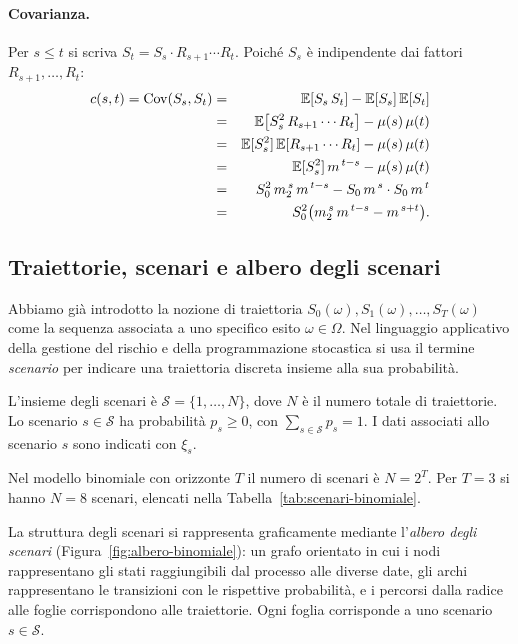 \paragraph{Covarianza.}
Per $s\leq t$ si scriva $S_t=S_s\cdot R_{s+1}\cdots R_t$. Poich\'{e}
$S_s$ \`{e} indipendente dai fattori $R_{s+1},\ldots,R_t$:
\begin{eqnarray*}
c(s,t)=\operatorname{Cov}(S_s,S_t)
&=& \mathbb{E}[S_s\,S_t]-\mathbb{E}[S_s]\,\mathbb{E}[S_t]\\
&=& \mathbb{E}\bigl[S_s^2\,R_{s+1}\cdots R_t\bigr]-\mu(s)\,\mu(t)\\
&=& \mathbb{E}[S_s^2]\,\mathbb{E}[R_{s+1}\cdots R_t]-\mu(s)\,\mu(t)\\
&=& \mathbb{E}[S_s^2]\,m^{\,t-s}-\mu(s)\,\mu(t)\\
&=& S_0^2\,m_2^{\,s}\,m^{\,t-s}-S_0\,m^{\,s}\cdot S_0\,m^{\,t}\\
&=& S_0^2\bigl(m_2^{\,s}\,m^{\,t-s}-m^{\,s+t}\bigr).
\end{eqnarray*}

\subsection{Traiettorie, scenari e albero degli scenari}

\noindent
Abbiamo gi\`{a} introdotto la nozione di traiettoria
$S_0(\omega),S_1(\omega),\ldots,S_T(\omega)$ come la sequenza
associata a uno specifico esito $\omega\in\Omega$. Nel linguaggio
applicativo della gestione del rischio e della programmazione
stocastica si usa il termine \emph{scenario} per indicare una
traiettoria discreta insieme alla sua probabilit\`{a}.

\begin{definition}
\label{def:scenari}
L'insieme degli scenari \`{e} $\mathcal{S}=\{1,\ldots,N\}$, dove $N$
\`{e} il numero totale di traiettorie. Lo scenario $s\in\mathcal{S}$
ha probabilit\`{a} $p_s\geq 0$, con $\sum_{s\in\mathcal{S}}p_s=1$.
I dati associati allo scenario $s$ sono indicati con $\xi_s$.
\end{definition}

Nel modello binomiale con orizzonte $T$ il numero di scenari \`{e}
$N=2^T$. Per $T=3$ si hanno $N=8$ scenari, elencati nella
Tabella~\ref{tab:scenari-binomiale}.

La struttura degli scenari si rappresenta graficamente mediante
l'\emph{albero degli scenari} (Figura~\ref{fig:albero-binomiale}): un
grafo orientato in cui i nodi rappresentano gli stati raggiungibili
dal processo alle diverse date, gli archi rappresentano le transizioni
con le rispettive probabilit\`{a}, e i percorsi dalla radice alle
foglie corrispondono alle traiettorie. Ogni foglia corrisponde a uno
scenario $s\in\mathcal{S}$.

